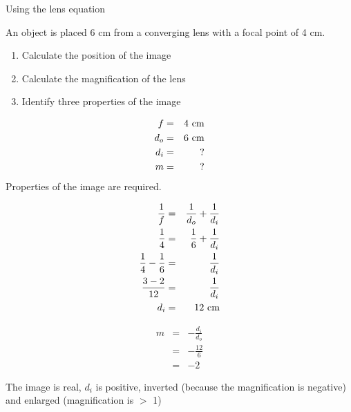 \begin{wex}{Using the lens equation}
{
An object is placed 6 cm from a converging lens with a focal point of 4 cm. \begin{enumerate} \item Calculate the position of the image \item Calculate the magnification of the lens \item Identify three properties of the image \end{enumerate}
}%
{
\begin{eqnarray*}
f &=& 4~\rm{cm} \\
d_{o} &=& 6~\rm{cm} \\
d_{i} &=& ? \\
m &=& ?
\end{eqnarray*}
Properties of the image are required.

\begin{eqnarray*}
\frac{1}{f} &=& \frac{1}{d_{o}} + \frac{1}{d_{i}}\\
\frac{1}{4} &=& \frac{1}{6} + \frac{1}{d_{i}} \\
\frac{1}{4}-\frac{1}{6} &=& \frac{1}{d_{i}} \\
\frac{3-2}{12} &=& \frac{1}{d_{i}} \\
d_{i} &=& 12~\rm{cm}
\end{eqnarray*}

\begin{eqnarray*}
m &=& -\frac{d_{i}}{d_{o}} \\
&=& -\frac{12}{6} \\
&=& -2
\end{eqnarray*}

The image is real, $d_{i}$ is positive, inverted (because the magnification is negative) and enlarged (magnification is $>$ 1)
}%
\end{wex}

